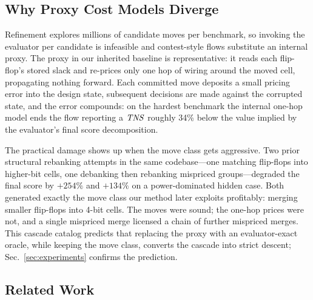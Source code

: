 \subsection{Why Proxy Cost Models Diverge}
\label{sec:proxy}

Refinement explores millions of candidate moves per benchmark, so invoking the evaluator per candidate is infeasible and contest-style flows substitute an internal proxy. The proxy in our inherited baseline is representative: it reads each flip-flop's stored slack and re-prices only one hop of wiring around the moved cell, propagating nothing forward. Each committed move deposits a small pricing error into the design state, subsequent decisions are made against the corrupted state, and the error compounds: on the hardest benchmark the internal one-hop model ends the flow reporting a $\mathit{TNS}$ roughly 34\% below the value implied by the evaluator's final score decomposition.

The practical damage shows up when the move class gets aggressive. Two prior structural rebanking attempts in the same codebase---one matching flip-flops into higher-bit cells, one debanking then rebanking mispriced groups---degraded the final score by $+254\%$ and $+134\%$ on a power-dominated hidden case. Both generated exactly the move class our method later exploits profitably: merging smaller flip-flops into 4-bit cells. The moves were sound; the one-hop prices were not, and a single mispriced merge licensed a chain of further mispriced merges. This cascade catalog predicts that replacing the proxy with an evaluator-exact oracle, while keeping the move class, converts the cascade into strict descent; Sec.~\ref{sec:experiments} confirms the prediction.

\subsection{Related Work}
\label{sec:related}

